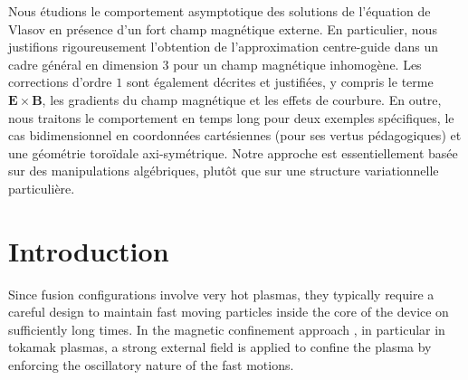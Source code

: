 \documentclass[JEP,XML,SOM,Unicode]{cedram}
\theoremstyle{plain}
\theoremstyle{definition}
\begin{document}



\begin{altabstract}
Nous étudions le comportement asymptotique des solutions de l'équation de Vlasov en présence d'un fort champ magnétique externe. En particulier, nous justifions rigoureusement l'obtention de l'approximation centre-guide dans un cadre général en dimension $3$ pour un champ magnétique inhomogène. Les corrections d'ordre $1$ sont également décrites et justifiées, y compris le terme $\boldsymbol{E}\times \boldsymbol{B}$, les gradients du champ magnétique et les effets de courbure. En outre, nous traitons le comportement en temps long pour deux exemples spécifiques, le cas bidimensionnel en coordonnées cartésiennes (pour ses vertus pédagogiques) et une géométrie toroïdale axi-symétrique. Notre approche est essentiellement basée sur des manipulations algébriques, plutôt que sur une structure variationnelle particulière.
\end{altabstract}

\maketitle
\vspace*{-1.1\baselineskip}\enlargethispage{.5\baselineskip}%
\tableofcontents


\section{Introduction}\label{s:introduction}

Since fusion configurations involve very hot plasmas, they typically
require a careful design to maintain fast moving particles inside the
core of the device on sufficiently long times. In the magnetic
confinement approach
\cite{bellan_2006_fundamentals,chen_introduction,freidberg2008plasma,haz_mei_03,miyamoto_2006_plasma,
piel2010plasma}, in particular in tokamak plasmas, a strong external
field is applied to confine the plasma by enforcing the oscillatory nature of the fast motions.
\end{document}
